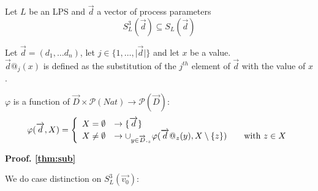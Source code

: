 \index{}\documentclass[a4paper,10pt]{article}
\theoremstyle{plain}
\theoremstyle{definition}
\newcommand{\ovr}{\overrightarrow}
\newcommand{\pps}{process parameters}
\newcommand{\tb}{\textbf}
\begin{document}
\begin{thm} Let $L$ be an LPS and $\ovr{d}$ a vector of \pps \label{thm:sub}
$$S_L^3(\ovr{d}) \subseteq S_L(\ovr{d}) $$
\end{thm} 
\begin{flushleft}

\begin{defn}[$@$] Let $\ovr{d} = (d_1, \dots d_n)$, let $j \in \lbrace 1, \ldots , \vert \ovr{d} \vert \rbrace$ and let $x$ be a value.\\
$\ovr{d}@_j(x)$ is defined as the substitution of the $j^{th}$ element of $\ovr{d}$ with the value of $x$.
\end{defn}


\begin{defn}[$\varphi(\ovr{d},X)$] 
$\varphi$ is a function of $\ovr{D} \times \mathcal{P}(Nat) \rightarrow \mathcal{P}(\ovr{D})$:
\begin{displaymath}
    \varphi(\ovr{d},X) = \left \{
        \begin{array}{l l}
            X = \emptyset                       & \rightarrow \lbrace \ovr{d} \rbrace \\
            X \neq \emptyset                    & \rightarrow \cup_{y \in \ovr{D}._z} \varphi(\ovr{d}@_z(y), X \setminus \lbrace z \rbrace ) \hspace{20pt} \text{with } z \in X \\
        \end{array} \right.
\end{displaymath}

\end{defn}

\tb{Proof. \ref{thm:sub}}
\end{flushleft}
We do case distinction on $S_L^3(\ovr{v_0})$:\\
\end{document}
